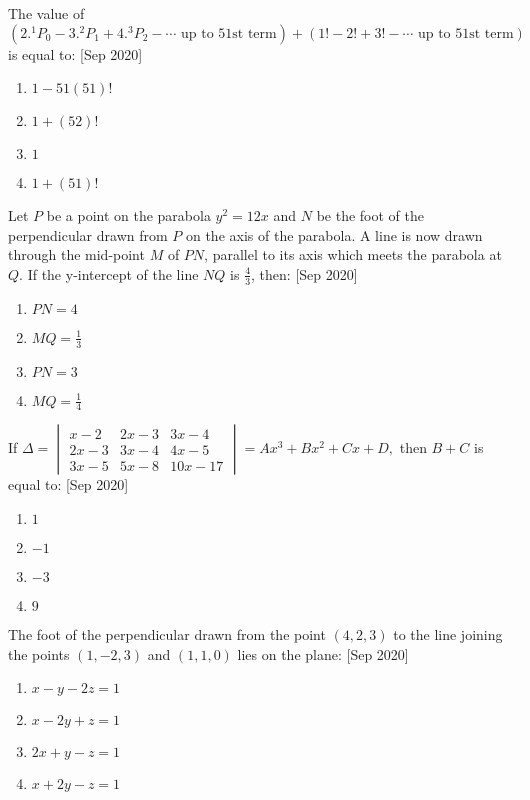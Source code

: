 \iffalse
\title{September 2020}
\author{AI24BTECH11012}
\section{mcq-single}
\fi
    \item The value of $ (2.^1P_0 - 3.^2P_1 + 4.^3P_2 - \cdots \text{ up to 51st term}) + (1! - 2! + 3! - \cdots \text{ up to 51st term}) $ 
    is equal to:
    \hfill{[Sep 2020]}
    \begin{enumerate}
        \item $ 1 - 51(51)! $
        \item $ 1 + (52)! $
        \item $ 1 $
        \item $ 1 + (51)! $
    \end{enumerate}

    \item Let $P$ be a point on the parabola $ y^2 = 12x $ and $ N $ be the foot of the perpendicular drawn from $ P $ on the axis of the parabola. A line is now drawn through the mid-point $ M $ of $ PN $, parallel to its axis which meets the parabola at $ Q $. If the y-intercept of the line $ NQ $ is $ \frac{4}{3} $, then:
    \hfill{[Sep 2020]}
    \begin{enumerate}
        \item $ PN = 4 $
        \item $ MQ = \frac{1}{3} $
        \item $ PN = 3 $
        \item $ MQ = \frac{1}{4} $
    \end{enumerate}

    \item If $ \Delta = \begin{vmatrix}
    x-2 & 2x-3 & 3x-4 \\
    2x-3 & 3x-4 & 4x-5 \\
    3x-5 & 5x-8 & 10x-17
    \end{vmatrix} = Ax^3 + Bx^2 + Cx + D, $ 
    then $ B + C $ is equal to:
    \hfill{[Sep 2020]}
    \begin{enumerate}
        \item $ 1 $
        \item $ -1 $
        \item $ -3 $
        \item $ 9 $
    \end{enumerate}

    \item The foot of the perpendicular drawn from the point $ (4, 2, 3) $ to the line joining the points $ (1, -2, 3) $ and $ (1, 1, 0) $ lies on the plane:
    \hfill{[Sep 2020]}
    \begin{enumerate}
        \item $ x - y - 2z = 1 $
        \item $ x - 2y + z = 1 $
        \item $ 2x + y - z = 1 $
        \item $ x + 2y - z = 1 $
    \end{enumerate}

